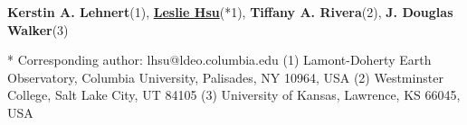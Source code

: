 \textbf{Kerstin A. Lehnert}(1), \href{https://www.authorea.com/users/7580}{\textbf{Leslie Hsu}}(*1), \textbf{Tiffany A. Rivera}(2), \textbf{J. Douglas Walker}(3)

* Corresponding author: lhsu@ldeo.columbia.edu
(1) Lamont-Doherty Earth Observatory, Columbia University, Palisades, NY 10964, USA
(2) Westminster College, Salt Lake City, UT 84105
(3) University of Kansas, Lawrence, KS 66045, USA
